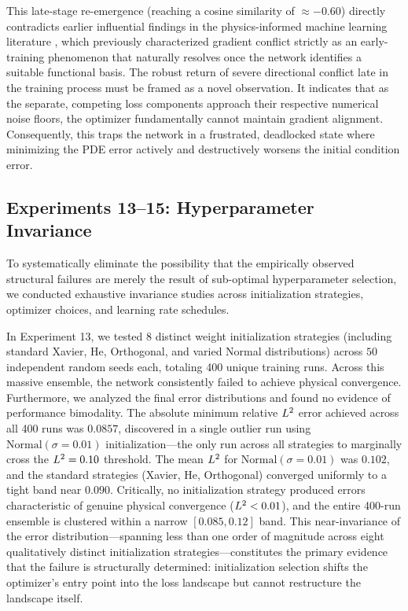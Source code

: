 This late-stage re-emergence (reaching a cosine similarity of $\approx -0.60$) directly contradicts earlier influential findings in the physics-informed machine learning literature \cite{Wang2021gradpathology}, which previously characterized gradient conflict strictly as an early-training phenomenon that naturally resolves once the network identifies a suitable functional basis. The robust return of severe directional conflict late in the training process must be framed as a novel observation. It indicates that as the separate, competing loss components approach their respective numerical noise floors, the optimizer fundamentally cannot maintain gradient alignment. Consequently, this traps the network in a frustrated, deadlocked state where minimizing the PDE error actively and destructively worsens the initial condition error.

\subsection{Experiments 13–15: Hyperparameter Invariance}\label{sec:exp13}\label{sec:exp14}\label{sec:exp15}

To systematically eliminate the possibility that the empirically observed structural failures are merely the result of sub-optimal hyperparameter selection, we conducted exhaustive invariance studies across initialization strategies, optimizer choices, and learning rate schedules.

In Experiment 13, we tested $8$ distinct weight initialization strategies (including standard Xavier, He, Orthogonal, and varied Normal distributions) across $50$ independent random seeds each, totaling 400 unique training runs. Across this massive ensemble, the network consistently failed to achieve physical convergence. Furthermore, we analyzed the final error distributions and found no evidence of performance bimodality. The absolute minimum relative $L^2$ error achieved across all 400 runs was $0.0857$, discovered in a single outlier run using $\text{Normal}(\sigma=0.01)$ initialization---the only run across all strategies to marginally cross the $L^2 = 0.10$ threshold. The mean $L^2$ for $\text{Normal}(\sigma=0.01)$ was $0.102$, and the standard strategies (Xavier, He, Orthogonal) converged uniformly to a tight band near $0.090$. Critically, no initialization strategy produced errors characteristic of genuine physical convergence ($L^2 < 0.01$), and the entire 400-run ensemble is clustered within a narrow $[0.085, 0.12]$ band. This near-invariance of the error distribution---spanning less than one order of magnitude across eight qualitatively distinct initialization strategies---constitutes the primary evidence that the failure is structurally determined: initialization selection shifts the optimizer's entry point into the loss landscape but cannot restructure the landscape itself.

